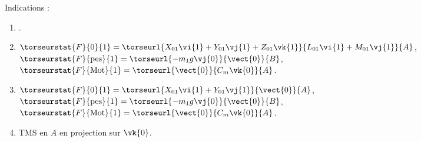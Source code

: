 \ifprof
\else
\ifcolle
\else


\begin{solution}
Indications :
\begin{enumerate}
\item .
\item $\torseurstat{F}{0}{1}=\torseurl{X_{01}\vi{1}+Y_{01}\vj{1}+Z_{01}\vk{1}}{L_{01}\vi{1}+M_{01}\vj{1}}{A}$,
$\torseurstat{F}{\text{pes}}{1}=\torseurl{-m_1g\vj{0}}{\vect{0}}{B}$,
$\torseurstat{F}{\text{Mot}}{1}=\torseurl{\vect{0}}{C_m\vk{0}}{A}$.
\item $\torseurstat{F}{0}{1}=\torseurl{X_{01}\vi{1}+Y_{01}\vj{1}}{\vect{0}}{A}$,
$\torseurstat{F}{\text{pes}}{1}=\torseurl{-m_1g\vj{0}}{\vect{0}}{B}$,
$\torseurstat{F}{\text{Mot}}{1}=\torseurl{\vect{0}}{C_m\vk{0}}{A}$.
\item TMS en $A$ en projection sur $\vk{0}$.
\end{enumerate} 
\end{solution}

\fi


\fi

